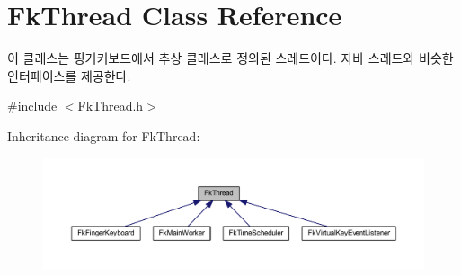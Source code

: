 \hypertarget{class_fk_thread}{}\section{Fk\+Thread Class Reference}
\label{class_fk_thread}


이 클래스는 핑거키보드에서 추상 클래스로 정의된 스레드이다. 자바 스레드와 비슷한 인터페이스를 제공한다.  




{\ttfamily \#include $<$Fk\+Thread.\+h$>$}



Inheritance diagram for Fk\+Thread\+:\nopagebreak
\begin{figure}[H]
\begin{center}
\leavevmode
\includegraphics[width=350pt]{class_fk_thread__inherit__graph}
\end{center}
\end{figure}
